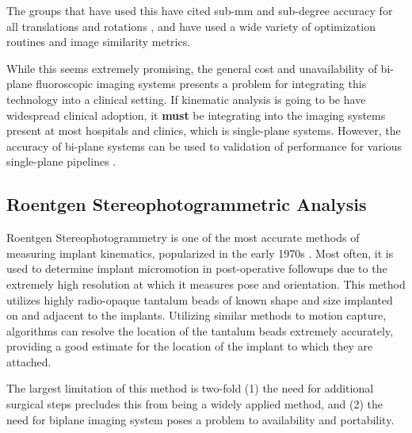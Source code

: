 The groups that have used this have cited sub-mm and sub-degree accuracy for all translations and rotations \cite{burtonAutomaticTrackingHealthy2021,youVivoMeasurement3D2001,bakaStatisticalShapeModelBased2012}, and have used a wide variety of optimization routines and image similarity metrics. 

While this seems extremely promising, the general cost and unavailability of bi-plane fluoroscopic imaging systems presents a problem for integrating this technology into a clinical setting. If kinematic analysis is going to be have widespread clinical adoption, it \textbf{must} be integrating into the imaging systems present at most hospitals and clinics, which is single-plane systems. However, the accuracy of bi-plane systems can be used to validation of performance for various single-plane pipelines \cite{brobergValidationMachineLearning2023}.

\subsection{Roentgen Stereophotogrammetric Analysis}

Roentgen Stereophotogrammetry is one of the most accurate methods of measuring implant kinematics, popularized in the early 1970s \cite{selvikRoentgenStereophotogrammetryMethod1989}. Most often, it is used to determine implant micromotion in post-operative followups due to the extremely high resolution at which it measures pose and orientation. This method utilizes highly radio-opaque tantalum beads of known shape and size implanted on and adjacent to the implants. Utilizing similar methods to motion capture, algorithms can resolve the location of the tantalum beads extremely accurately, providing a good estimate for the location of the implant to which they are attached.

The largest limitation of this method is two-fold (1) the need for additional surgical steps precludes this from being a widely applied method, and (2) the need for biplane imaging system poses a problem to availability and portability.
